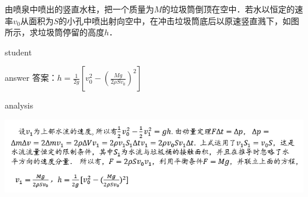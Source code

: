\begin{example}
	由喷泉中喷出的竖直水柱，把一个质量为$ M $的垃圾筒倒顶在空中．若水以恒定的速率$ v_0 $从面积为$ S $的小孔中喷出射向空中，在冲击垃圾筒底后以原速竖直溅下，如图所示，求垃圾筒停留的高度$ h $．
	
	\begin{taggedblock}{student}
		\vspace*{2cm}
	\end{taggedblock}
	
	
	\begin{taggedblock}{answer}
		答案：$ h = \frac{1}{2g}\left[ v_0^2-\left( \frac{Mg}{2\rho S v_0} \right)^2  \right]  $
	\end{taggedblock}
	
	
	\begin{taggedblock}{analysis}
	\begin{center}
\includegraphics[width=0.9\linewidth]{image/momentum-19}
\end{center}

	\end{taggedblock}
\end{example}

